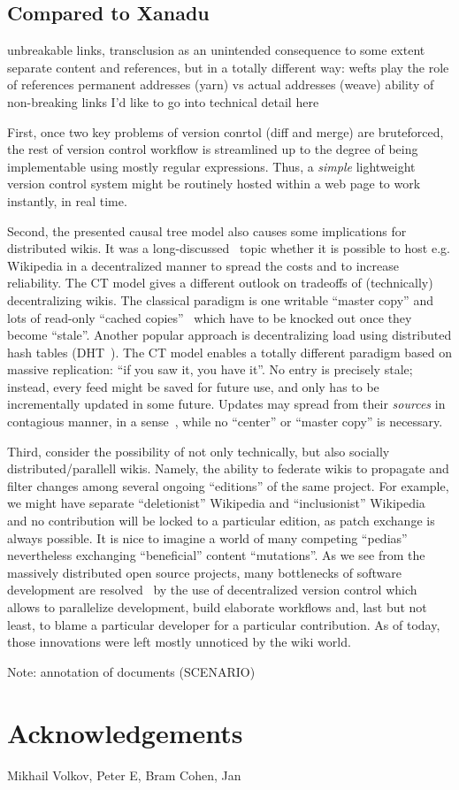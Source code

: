 \documentclass{acm_proc_article-sp}
\begin{document}
\subsection{Compared to Xanadu}

unbreakable links, transclusion  as an unintended consequence
to some extent separate content and references, but in a totally different way:
wefts play the role of references
permanent addresses (yarn) vs actual addresses (weave)
ability of non-breaking links  I'd like to go into technical detail here


First, once two key problems of version conrtol (diff and merge) are bruteforced, the rest of version control workflow is streamlined up to the degree of being implementable using mostly regular expressions. Thus, a \emph{simple} lightweight version control system might be routinely hosted within a web page to work instantly, in real time.

Second, the presented causal tree model also causes some implications for distributed wikis. It was a long-discussed~\cite{dht-wiki,piki} topic whether it is possible to host e.g. Wikipedia in a decentralized manner to spread the costs and to increase reliability. The CT model gives a different outlook on tradeoffs of (technically) decentralizing wikis. The classical paradigm is one writable ``master copy'' and lots of read-only ``cached copies''~\cite{steen-wiki} which have to be knocked out once they become ``stale''. Another popular approach is decentralizing load using distributed hash tables (DHT~\cite{dht-wiki}). The CT model enables a totally different paradigm based on massive replication: ``if you saw it, you have it''. No entry is precisely stale; instead, every feed might be saved for future use, and only has to be incrementally updated in some future. Updates may spread from their \emph{sources} in contagious manner, in a sense~\cite{contagious}, while no ``center'' or ``master copy'' is necessary.


Third, consider the possibility of not only technically, but also socially distributed/parallell wikis. Namely, the ability to federate wikis to propagate and filter changes among several ongoing ``editions'' of the same project. For example, we might have separate ``deletionist'' Wikipedia and ``inclusionist'' Wikipedia~\cite{delinc} and no contribution will be locked to a particular edition, as patch exchange is always possible. It is nice to imagine a world of many competing ``pedias'' nevertheless exchanging ``beneficial'' content ``mutations''. As we see from the massively distributed open source projects, many bottlenecks of software development are resolved~\cite{git} by the use of decentralized version control which allows to parallelize development, build elaborate workflows and, last but not least, to blame a particular developer for a particular contribution. As of today, those innovations were left mostly unnoticed by the wiki world.

Note: annotation of documents (SCENARIO)

\section{Acknowledgements}

Mikhail Volkov, Peter E, Bram Cohen, Jan
\end{document}
